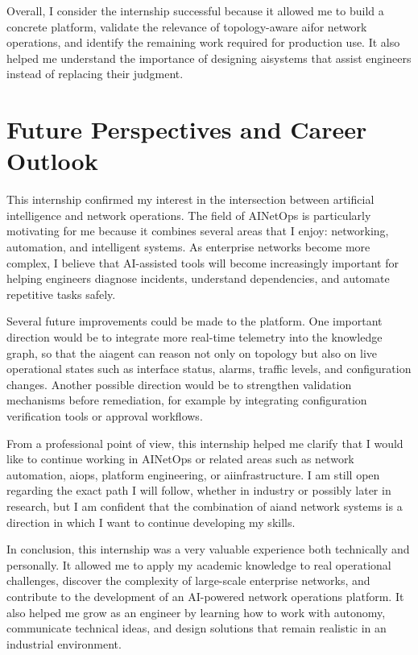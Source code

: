 \documentclass[11pt,a4paper]{report}
\begin{document}
Overall, I consider the internship successful because it allowed me to build a concrete platform, validate the relevance of topology-aware \gls{ai}for network operations, and identify the remaining work required for production use. It also helped me understand the importance of designing \gls{ai}systems that assist engineers instead of replacing their judgment.

\section*{Future Perspectives and Career Outlook}

This internship confirmed my interest in the intersection between artificial intelligence and network operations. The field of \gls{AINetOps} is particularly motivating for me because it combines several areas that I enjoy: networking, automation, and intelligent systems. As enterprise networks become more complex, I believe that AI-assisted tools will become increasingly important for helping engineers diagnose incidents, understand dependencies, and automate repetitive tasks safely.

Several future improvements could be made to the platform. One important direction would be to integrate more real-time telemetry into the knowledge graph, so that the \gls{ai}agent can reason not only on topology but also on live operational states such as interface status, alarms, traffic levels, and configuration changes. Another possible direction would be to strengthen validation mechanisms before remediation, for example by integrating configuration verification tools or approval workflows.

From a professional point of view, this internship helped me clarify that I would like to continue working in \gls{AINetOps} or related areas such as network automation, \gls{aiops}, platform engineering, or \gls{ai}infrastructure. I am still open regarding the exact path I will follow, whether in industry or possibly later in research, but I am confident that the combination of \gls{ai}and network systems is a direction in which I want to continue developing my skills.

In conclusion, this internship was a very valuable experience both technically and personally. It allowed me to apply my academic knowledge to real operational challenges, discover the complexity of large-scale enterprise networks, and contribute to the development of an AI-powered network operations platform. It also helped me grow as an engineer by learning how to work with autonomy, communicate technical ideas, and design solutions that remain realistic in an industrial environment.
\end{document}
